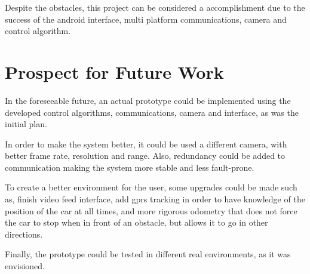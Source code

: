 Despite the obstacles, this project can be considered a accomplishment due to the success of the android interface, multi platform communications, camera and control algorithm.
%
\section{Prospect for Future Work}%
\label{ch:conclusion-future-work}
In the foreseeable future, an actual prototype could be implemented using the
developed control algorithms, communications, camera and interface, as was the
initial plan.

In order to make the system better, it could be used a different camera, with better frame rate, resolution and range. Also, redundancy could be added to communication making the system more stable and less fault-prone. 

To create a better environment for the user, some upgrades could be made such
as, finish video feed interface, add gprs tracking in order to have knowledge of
the position of the car at all times, and more rigorous odometry that does not
force the car to stop when in front of an obstacle, but allows it to go in other
directions.

Finally, the prototype could be tested in different real environments, as it was envisioned.
